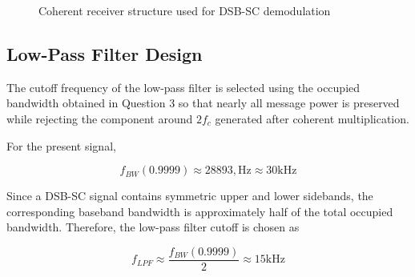 \documentclass{article}
\begin{document}
\begin{figure}[h]
\centering
{}
\caption{Coherent receiver structure used for DSB-SC demodulation}
\end{figure}


\subsection*{Low-Pass Filter Design}

The cutoff frequency of the low-pass filter is selected using the occupied bandwidth obtained in Question 3 so that nearly all message power is preserved while rejecting the component around $2f_c$ generated after coherent multiplication.

For the present signal,

\begin{equation*}
f_{BW}(0.9999) \approx 28893,\text{Hz} \approx 30\text{kHz}
\end{equation*}
\vspace{-0.3cm}

Since a DSB-SC signal contains symmetric upper and lower sidebands, the corresponding baseband bandwidth is approximately half of the total occupied bandwidth. Therefore, the low-pass filter cutoff is chosen as

\begin{equation*}
f_{LPF} \approx \frac{f_{BW}(0.9999)}{2} \approx 15\text{kHz}
\end{equation*}
\vspace{-0.3cm}
\end{document}
